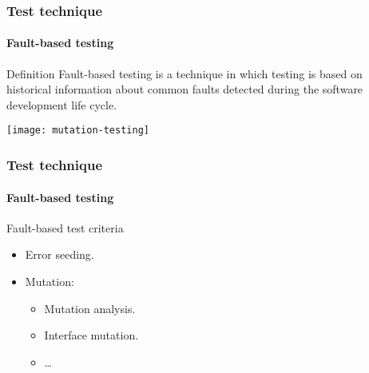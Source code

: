 \begin{frame}
\frametitle{Test technique}
\framesubtitle{Fault-based testing}
\label{concept:fault-based-testing}

\begin{block:concept}{Definition}
Fault-based testing is a technique in which testing is based on
historical information about common faults detected during the software
development life cycle.
\end{block:concept}

\begin{block:fact}{}
    \centering
    \texttt{[image: mutation-testing]}
\end{block:fact}
\end{frame}


\begin{frame}[hasprev=true, hasnext=false]
\frametitle{Test technique}
\framesubtitle{Fault-based testing}
\label{concept:fault-based-test-criteria}

\begin{block:fact}{Fault-based test criteria}
\begin{itemize}
	\item Error seeding.
	\item Mutation:
	\begin{itemize}
		\item Mutation analysis.
		\item Interface mutation.
		\item \ldots
	\end{itemize}
\end{itemize}
\end{block:fact}

\hfill
{}
\end{frame}
